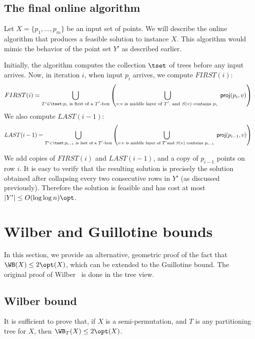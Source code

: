 \documentclass{toc}
\begin{document}
\fi

\subsection{The final online algorithm} \label{subsec: online final}
Let $X=\{p_1,\ldots, p_m\}$ be an input set of points. 
We will describe the online algorithm that produces a feasible solution to instance $X$. 
This algorithm would mimic the behavior of the point set $Y'$ as described earlier. 

Initially, the algorithm computes the collection $\tset$ of trees before any input arrives. 
Now, in iteration $i$, when input $p_i$ arrives, we compute $FIRST(i)$: 
\[FIRST(i) = \bigcup_{T' \in \tset: p_i \text{ is first of a $T'$-box}} \left( \bigcup_{v:\text{$v$ is middle layer of $T'$, and $S(v)$ contains $p_i$ }} {\sf proj}(p_i, v)\right) \] 
We also compute $LAST(i-1)$: 
\[LAST(i-1)= \bigcup_{T' \in \tset: p_{i-1} \text{ is last of a $T'$-box}} \left( \bigcup_{v:\text{$v$ is middle layer of $T'$}\\ \text{and $S(v)$ contains $p_{i-1}$ }} {\sf proj}(p_{i-1}, v)\right)\]
%

We add copies of $FIRST(i)$ and $LAST(i-1)$, and a copy of $p_{i-1}$ points on row $i$. 
It is easy to verify that the resulting solution is precisely the solution obtained after collapsing every two consecutive rows in $Y'$ (as discussed previously). Therefore the solution is feasible and has cost at most $|Y'| \leq O(\log \log n) \opt$.   



%

%
 
%
%
%
%
    
%
%

%

%

\section{Wilber and Guillotine bounds} 
\label{sec:direct WB LB}

In this section, we provide an alternative, geometric proof of the fact that $\WB(X) \leq 2 \opt(X)$, which can be extended to the Guillotine bound. 
The original proof of Wilber~\cite{wilber} is done in the tree view. 
%

\subsection{Wilber bound} 
It is sufficient to prove that, if $X$ is a semi-permutation, and $T$ is any partitioning tree for $X$, then $\WB_T(X) \leq 2\opt(X)$. %
\end{document}
